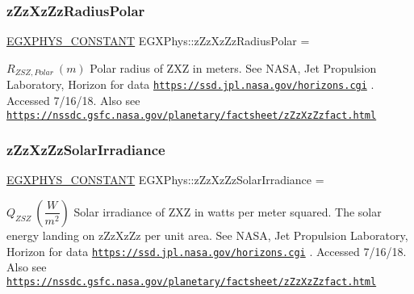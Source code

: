 \subsubsection{\texorpdfstring{z\+Zz\+Xz\+Zz\+Radius\+Polar}{zZzXzZzRadiusPolar}}
{\footnotesize\ttfamily \mbox{\hyperlink{group___e_g_x_phys-_constants-_macros_ga76980d288494ce1714c9ac68a95ba702}{E\+G\+X\+P\+H\+Y\+S\+\_\+\+C\+O\+N\+S\+T\+A\+NT}} E\+G\+X\+Phys\+::z\+Zz\+Xz\+Zz\+Radius\+Polar =}

$R_{ZSZ,Polar} \ (m)$ Polar radius of Z\+XZ in meters. See N\+A\+SA, Jet Propulsion Laboratory, Horizon for data \href{https://ssd.jpl.nasa.gov/horizons.cgi}{\tt https\+://ssd.\+jpl.\+nasa.\+gov/horizons.\+cgi} . Accessed 7/16/18. Also see \href{https://nssdc.gsfc.nasa.gov/planetary/factsheet/zZzXzZzfact.html}{\tt https\+://nssdc.\+gsfc.\+nasa.\+gov/planetary/factsheet/z\+Zz\+Xz\+Zzfact.\+html} \mbox{\label{group___e_g_x_phys-_constants-_astrophysics-_solar_system-_z_x_z-_bulk_gaa789319f8b2eef61c67715c86ccb1e6c}} 
\subsubsection{\texorpdfstring{z\+Zz\+Xz\+Zz\+Solar\+Irradiance}{zZzXzZzSolarIrradiance}}
{\footnotesize\ttfamily \mbox{\hyperlink{group___e_g_x_phys-_constants-_macros_ga76980d288494ce1714c9ac68a95ba702}{E\+G\+X\+P\+H\+Y\+S\+\_\+\+C\+O\+N\+S\+T\+A\+NT}} E\+G\+X\+Phys\+::z\+Zz\+Xz\+Zz\+Solar\+Irradiance =}

$ Q_{ZSZ} \ (\dfrac{W}{m^2})$ Solar irradiance of Z\+XZ in watts per meter squared. The solar energy landing on z\+Zz\+Xz\+Zz per unit area. See N\+A\+SA, Jet Propulsion Laboratory, Horizon for data \href{https://ssd.jpl.nasa.gov/horizons.cgi}{\tt https\+://ssd.\+jpl.\+nasa.\+gov/horizons.\+cgi} . Accessed 7/16/18. Also see \href{https://nssdc.gsfc.nasa.gov/planetary/factsheet/zZzXzZzfact.html}{\tt https\+://nssdc.\+gsfc.\+nasa.\+gov/planetary/factsheet/z\+Zz\+Xz\+Zzfact.\+html} \mbox{\label{group___e_g_x_phys-_constants-_astrophysics-_solar_system-_z_x_z-_bulk_ga04a2de36ba9ec0a40a00434fea277a00}} 
